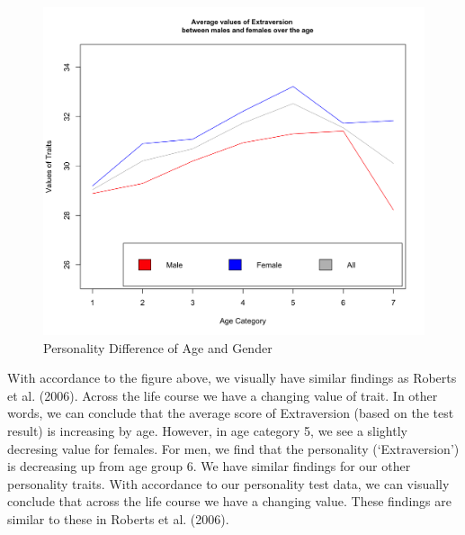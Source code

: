 \begin{figure}[ht]
\setlength{\abovecaptionskip}{-4pt}
\begin{center}
  \includegraphics[width=13cm]{Figures/AVG_Extra_Gender}
  \caption{Personality Difference of Age and Gender}
\end{center}
\end{figure}
\newline \newline
With accordance to the figure above, we visually have similar findings as Roberts et al. (2006). Across the life course we have a changing value of trait. In other words, we can conclude that the average score of Extraversion (based on the test result) is increasing by age. However, in age category 5, we see a slightly decresing value for females. For men, we find that the personality (`Extraversion') is decreasing up from age group 6. 
\newline \newline
We have similar findings for our other personality traits. With accordance to our personality test data, we can visually conclude that across the life course we have a changing value. These findings are similar to these in Roberts et al. (2006).
\newline \newline
